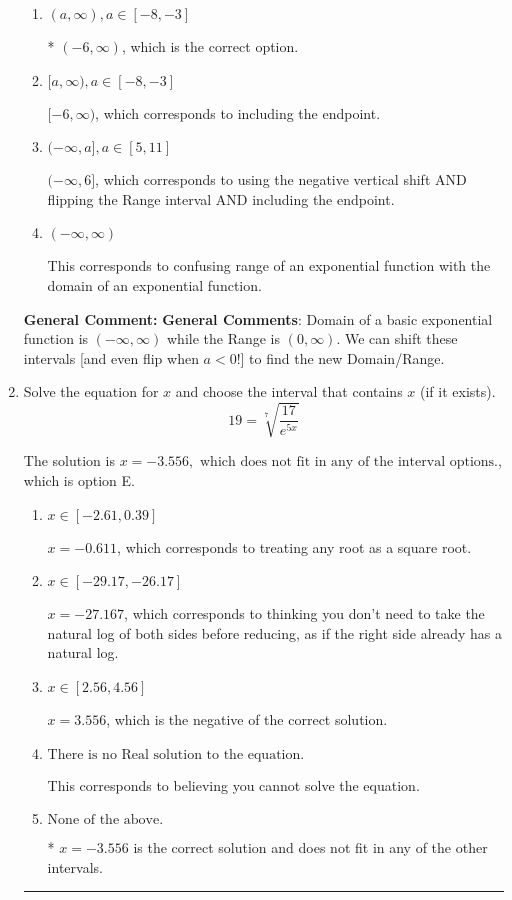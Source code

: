 \documentclass{extbook}[14pt]
\newcommand{\litem}[1]{\item #1

\rule{\textwidth}{0.4pt}}
\begin{document}
\begin{enumerate}
{\begin{enumerate}[label=\Alph*.]
$(-\infty, 6)$, which corresponds to using the negative vertical shift AND flipping the Range interval.
\item \( (a, \infty), a \in [-8, -3] \)

* $(-6, \infty)$, which is the correct option.
\item \( [a, \infty), a \in [-8, -3] \)

$[-6, \infty)$, which corresponds to including the endpoint.
\item \( (-\infty, a], a \in [5, 11] \)

$(-\infty, 6]$, which corresponds to using the negative vertical shift AND flipping the Range interval AND including the endpoint.
\item \( (-\infty, \infty) \)

This corresponds to confusing range of an exponential function with the domain of an exponential function.
\end{enumerate}

\textbf{General Comment:} \textbf{General Comments}: Domain of a basic exponential function is $(-\infty, \infty)$ while the Range is $(0, \infty)$. We can shift these intervals [and even flip when $a<0$!] to find the new Domain/Range.
}
\litem{
 Solve the equation for $x$ and choose the interval that contains $x$ (if it exists).
\[  19 = \sqrt[7]{\frac{17}{e^{5x}}} \]

The solution is \( x = -3.556, \text{ which does not fit in any of the interval options.} \), which is option E.\begin{enumerate}[label=\Alph*.]
\item \( x \in [-2.61, 0.39] \)

$x = -0.611$, which corresponds to treating any root as a square root.
\item \( x \in [-29.17, -26.17] \)

$x = -27.167$, which corresponds to thinking you don't need to take the natural log of both sides before reducing, as if the right side already has a natural log.
\item \( x \in [2.56, 4.56] \)

$x = 3.556$, which is the negative of the correct solution.
\item \( \text{There is no Real solution to the equation.} \)

This corresponds to believing you cannot solve the equation.
\item \( \text{None of the above.} \)

* $x = -3.556$ is the correct solution and does not fit in any of the other intervals.
\end{enumerate}

}
\end{enumerate}
\end{document}
